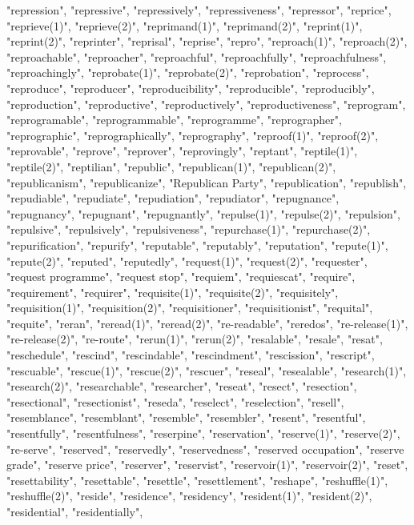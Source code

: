 "repression",
"repressive",
"repressively",
"repressiveness",
"repressor",
"reprice",
"reprieve(1)",
"reprieve(2)",
"reprimand(1)",
"reprimand(2)",
"reprint(1)",
"reprint(2)",
"reprinter",
"reprisal",
"reprise",
"repro",
"reproach(1)",
"reproach(2)",
"reproachable",
"reproacher",
"reproachful",
"reproachfully",
"reproachfulness",
"reproachingly",
"reprobate(1)",
"reprobate(2)",
"reprobation",
"reprocess",
"reproduce",
"reproducer",
"reproducibility",
"reproducible",
"reproducibly",
"reproduction",
"reproductive",
"reproductively",
"reproductiveness",
"reprogram",
"reprogramable",
"reprogrammable",
"reprogramme",
"reprographer",
"reprographic",
"reprographically",
"reprography",
"reproof(1)",
"reproof(2)",
"reprovable",
"reprove",
"reprover",
"reprovingly",
"reptant",
"reptile(1)",
"reptile(2)",
"reptilian",
"republic",
"republican(1)",
"republican(2)",
"republicanism",
"republicanize",
"Republican Party",
"republication",
"republish",
"repudiable",
"repudiate",
"repudiation",
"repudiator",
"repugnance",
"repugnancy",
"repugnant",
"repugnantly",
"repulse(1)",
"repulse(2)",
"repulsion",
"repulsive",
"repulsively",
"repulsiveness",
"repurchase(1)",
"repurchase(2)",
"repurification",
"repurify",
"reputable",
"reputably",
"reputation",
"repute(1)",
"repute(2)",
"reputed",
"reputedly",
"request(1)",
"request(2)",
"requester",
"request programme",
"request stop",
"requiem",
"requiescat",
"require",
"requirement",
"requirer",
"requisite(1)",
"requisite(2)",
"requisitely",
"requisition(1)",
"requisition(2)",
"requisitioner",
"requisitionist",
"requital",
"requite",
"reran",
"reread(1)",
"reread(2)",
"re-readable",
"reredos",
"re-release(1)",
"re-release(2)",
"re-route",
"rerun(1)",
"rerun(2)",
"resalable",
"resale",
"resat",
"reschedule",
"rescind",
"rescindable",
"rescindment",
"rescission",
"rescript",
"rescuable",
"rescue(1)",
"rescue(2)",
"rescuer",
"reseal",
"resealable",
"research(1)",
"research(2)",
"researchable",
"researcher",
"reseat",
"resect",
"resection",
"resectional",
"resectionist",
"reseda",
"reselect",
"reselection",
"resell",
"resemblance",
"resemblant",
"resemble",
"resembler",
"resent",
"resentful",
"resentfully",
"resentfulness",
"reserpine",
"reservation",
"reserve(1)",
"reserve(2)",
"re-serve",
"reserved",
"reservedly",
"reservedness",
"reserved occupation",
"reserve grade",
"reserve price",
"reserver",
"reservist",
"reservoir(1)",
"reservoir(2)",
"reset",
"resettability",
"resettable",
"resettle",
"resettlement",
"reshape",
"reshuffle(1)",
"reshuffle(2)",
"reside",
"residence",
"residency",
"resident(1)",
"resident(2)",
"residential",
"residentially",
